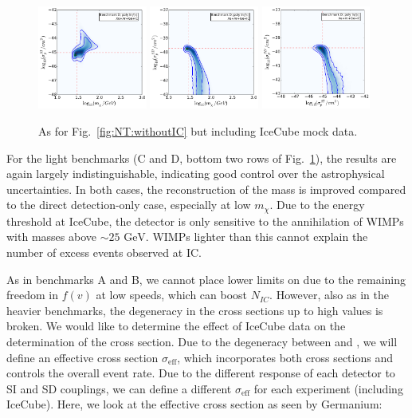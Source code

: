 \begin{figure}[p!]
  \includegraphics[trim=0.2cm 0.2cm 0.2cm 0.2cm, clip,width=0.32\textwidth]{NT/BenchmarkD_poly-mx_sigsi.pdf}
  \includegraphics[trim=0.2cm 0.2cm 0.2cm 0.2cm, clip,width=0.32\textwidth]{NT/BenchmarkD_poly-mx_sigsd.pdf}
  \includegraphics[trim=0.2cm 0.2cm 0.2cm 0.2cm, clip,width=0.32\textwidth]{NT/BenchmarkD_poly-sigsi_sigsd.pdf}
\caption{As for Fig.~\ref{fig:NT:withoutIC} but including IceCube mock data. }
\label{fig:NT:withIC}
\end{figure}

For the light benchmarks (C and D, bottom two rows of Fig.~\ref{fig:NT:withIC}), the results are again largely indistinguishable, indicating good control over the astrophysical uncertainties. In both cases, the reconstruction of the mass is improved compared to the direct detection-only case, especially at low $m_\chi$. Due to the energy threshold at IceCube, the detector is only sensitive to the annihilation of WIMPs with masses above $\sim 25 \textrm{ GeV}$. WIMPs lighter than this cannot explain the number of excess events observed at IC. 

As in benchmarks A and B, we cannot place lower limits on \sigmapsd due to the remaining freedom in $f(v)$ at low speeds, which can boost $N_{IC}$. However, also as in the heavier benchmarks, the degeneracy in the cross sections up to high values is broken. We would like to determine the effect of IceCube data on the determination of the cross section. Due to the degeneracy between \sigmapsi and \sigmapsd, we will define an effective cross section $\sigma_\textrm{eff}$, which incorporates both cross sections and controls the overall event rate. Due to the different response of each detector to SI and SD couplings, we can define a different $\sigma_\textrm{eff}$ for each experiment (including IceCube). Here, we look at the effective cross section as seen by Germanium:

